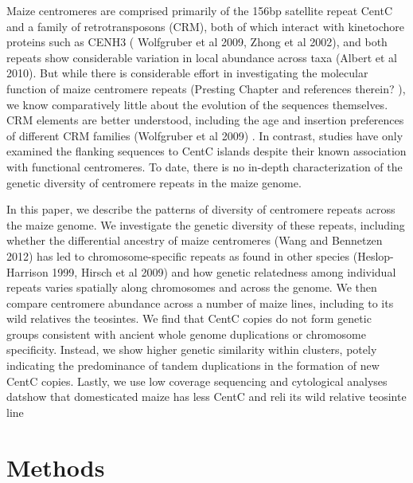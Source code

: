 Maize centromeres are comprised primarily of the 156bp satellite repeat CentC and a family of retrotransposons (CRM), both of which interact with  kinetochore proteins such as CENH3 ( Wolfgruber et al 2009, Zhong et al 2002), and both repeats show considerable variation in local abundance across taxa (Albert et al 2010).  But while there is considerable effort in investigating the molecular function of maize centromere repeats (Presting Chapter and references therein? ), we know comparatively little about the evolution of the sequences themselves. CRM elements are better understood, including the age and insertion preferences of different CRM families (Wolfgruber et al 2009) .  In contrast,  studies  have only examined the flanking sequences to CentC islands despite their known association with functional centromeres.  To date, there is no in-depth characterization of the genetic diversity of centromere repeats in the maize genome.  

In this paper, we describe the patterns of diversity of centromere repeats across the maize genome.  We investigate the genetic diversity of these repeats, including whether the differential ancestry of maize centromeres (Wang and Bennetzen 2012) has led to chromosome-specific repeats as found in other species (Heslop-Harrison 1999, Hirsch et al 2009) and how genetic relatedness among individual repeats varies spatially along chromosomes and across the genome.  We then compare centromere abundance across a number of maize lines, including to its wild relatives the teosintes.  We find that CentC copies do not form genetic groups consistent with ancient whole genome duplications or chromosome specificity.  Instead, we show higher genetic similarity within clusters, potely indicating the predominance of tandem duplications in the formation of new CentC copies.  Lastly, we use low coverage sequencing and cytological analyses datshow that domesticated maize has less CentC and reli its wild relative  teosinte line

\section*{Methods}
\label{methods}

